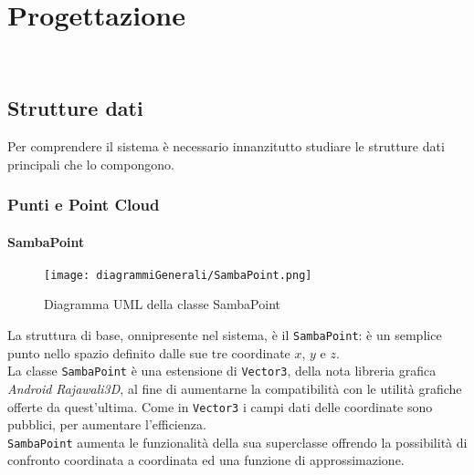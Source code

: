 
\chapter{Progettazione}
\label{cap:progettazione-codifica}

\\


\section{Strutture dati}
Per comprendere il sistema è necessario innanzitutto studiare le strutture dati principali che lo compongono.\\

\subsection{Punti e Point Cloud}

\subsubsection{SambaPoint}
\begin{figure}[H] 
    \centering 
    \texttt{[image: diagrammiGenerali/SambaPoint.png]} 
    \caption{Diagramma UML della classe SambaPoint}
\end{figure}
La struttura di base, onnipresente nel sistema, è il \texttt{SambaPoint}: è un semplice punto nello spazio definito dalle sue tre coordinate $x$, $y$ e $z$.\\
La classe \texttt{SambaPoint} è una estensione di \texttt{Vector3}, della nota libreria grafica \emph{Android} \emph{Rajawali3D}, al fine di aumentarne la compatibilità con le utilità grafiche offerte da quest'ultima. Come in \texttt{Vector3} i campi dati delle coordinate sono pubblici, per aumentare l'efficienza.\\
\texttt{SambaPoint} aumenta le funzionalità della sua superclasse offrendo la possibilità di confronto coordinata a coordinata ed una funzione di approssimazione. 

